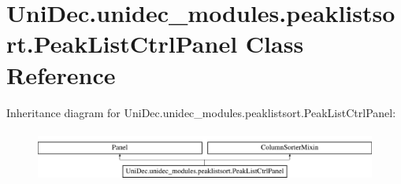\hypertarget{class_uni_dec_1_1unidec__modules_1_1peaklistsort_1_1_peak_list_ctrl_panel}{}\section{Uni\+Dec.\+unidec\+\_\+modules.\+peaklistsort.\+Peak\+List\+Ctrl\+Panel Class Reference}
\label{class_uni_dec_1_1unidec__modules_1_1peaklistsort_1_1_peak_list_ctrl_panel}
Inheritance diagram for Uni\+Dec.\+unidec\+\_\+modules.\+peaklistsort.\+Peak\+List\+Ctrl\+Panel\+:\begin{figure}[H]
\begin{center}
\leavevmode
\includegraphics[height=1.717791cm]{class_uni_dec_1_1unidec__modules_1_1peaklistsort_1_1_peak_list_ctrl_panel}
\end{center}
\end{figure}
